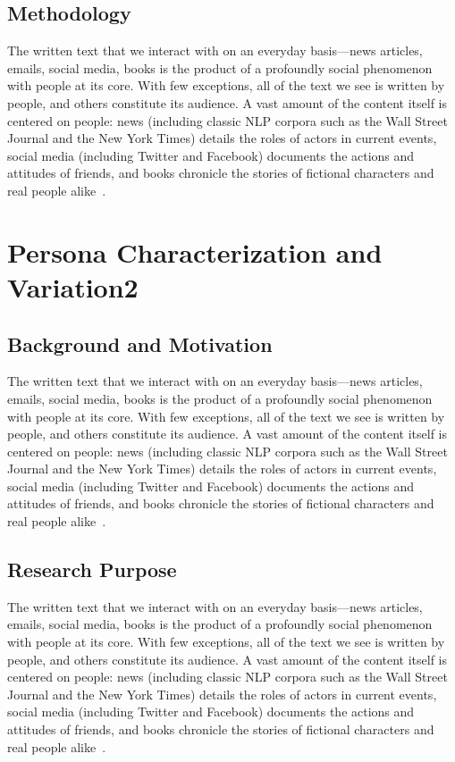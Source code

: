 \documentclass[11pt]{article}
\renewcommand\cite{\citep}  %
\begin{document}
\subsection{Methodology}
The written text that we interact with on an everyday basis—news articles, emails, social media, books is the product of a profoundly social phenomenon with people at its core. With few exceptions, all of the text we see is written by people, and others constitute its audience. A vast amount of the content itself is centered on people: news (including classic NLP corpora such as the Wall Street Journal and the New York Times) details the roles of actors in current events, social media (including Twitter and Facebook) documents
the actions and attitudes of friends, and books chronicle the stories of fictional characters and real people alike~\cite{serban2016building}.
\section{Persona Characterization and Variation2}
\subsection{Background and Motivation}
The written text that we interact with on an everyday basis—news articles, emails, social media, books is the product of a profoundly social phenomenon with people at its core. With few exceptions, all of the text we see is written by people, and others constitute its audience. A vast amount of the content itself is centered on people: news (including classic NLP corpora such as the Wall Street Journal and the New York Times) details the roles of actors in current events, social media (including Twitter and Facebook) documents
the actions and attitudes of friends, and books chronicle the stories of fictional characters and real people alike~\cite{serban2016building}.
\subsection{Research Purpose}
The written text that we interact with on an everyday basis—news articles, emails, social media, books is the product of a profoundly social phenomenon with people at its core. With few exceptions, all of the text we see is written by people, and others constitute its audience. A vast amount of the content itself is centered on people: news (including classic NLP corpora such as the Wall Street Journal and the New York Times) details the roles of actors in current events, social media (including Twitter and Facebook) documents
the actions and attitudes of friends, and books chronicle the stories of fictional characters and real people alike~\cite{serban2016building}.
\end{document}
